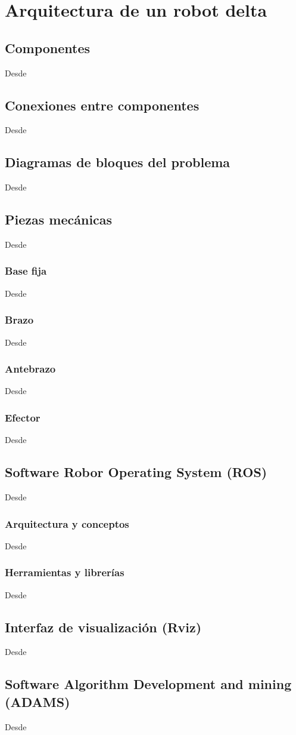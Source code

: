 \chapter{Arquitectura de un robot delta}\label{CAP3}

\section{Componentes}

    Desde
    
\section{Conexiones entre componentes}
    Desde
    
\section{Diagramas de bloques del problema}
    Desde

\section{Piezas mecánicas}
    Desde
    
    \subsection{Base fija}
        Desde
    \subsection{Brazo}
        Desde
    \subsection{Antebrazo}
        Desde
    \subsection{Efector}
        Desde
    
\section{Software Robor Operating System (ROS)}
    Desde
    \subsection{Arquitectura y conceptos}
        Desde
    \subsection{Herramientas y librerías}
        Desde

\section{Interfaz de visualización (Rviz)}
    Desde
    
\section{Software Algorithm Development and mining (ADAMS)}
Desde

    
      
        
            
            
            

        
    
    